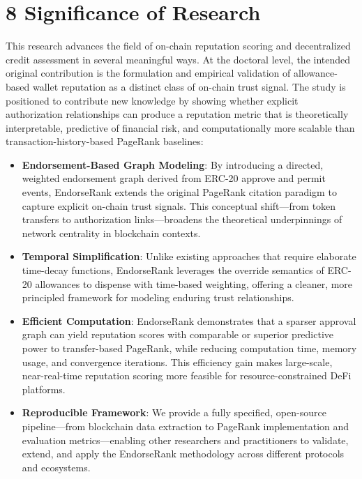 \clearpage
{}
\section*{8 \textbf{Significance of Research}}
\label{sec:significance-of-research}

This research advances the field of on-chain reputation scoring and decentralized credit assessment in several meaningful ways. At the doctoral level, the intended original contribution is the formulation and empirical validation of allowance-based wallet reputation as a distinct class of on-chain trust signal. The study is positioned to contribute new knowledge by showing whether explicit authorization relationships can produce a reputation metric that is theoretically interpretable, predictive of financial risk, and computationally more scalable than transaction-history-based PageRank baselines:



\begin{itemize}
\item[\textbullet] \textbf{Endorsement-Based Graph Modeling}: By introducing a directed, weighted endorsement graph derived from ERC-20 approve and permit events, EndorseRank extends the original PageRank citation paradigm to capture explicit on-chain trust signals. This conceptual shift---from token transfers to authorization links---broadens the theoretical underpinnings of network centrality in blockchain contexts.
\item[\textbullet] \textbf{Temporal Simplification}: Unlike existing approaches that require elaborate time-decay functions, EndorseRank leverages the override semantics of ERC-20 allowances to dispense with time-based weighting, offering a cleaner, more principled framework for modeling enduring trust relationships.
\end{itemize}

\begin{itemize}
\item[\textbullet] \textbf{Efficient Computation}: EndorseRank demonstrates that a sparser approval graph can yield reputation scores with comparable or superior predictive power to transfer-based PageRank, while reducing computation time, memory usage, and convergence iterations. This efficiency gain makes large-scale, near-real-time reputation scoring more feasible for resource-constrained DeFi platforms.
\item[\textbullet] \textbf{Reproducible Framework}: We provide a fully specified, open-source pipeline---from blockchain data extraction to PageRank implementation and evaluation metrics---enabling other researchers and practitioners to validate, extend, and apply the EndorseRank methodology across different protocols and ecosystems.
\end{itemize}

